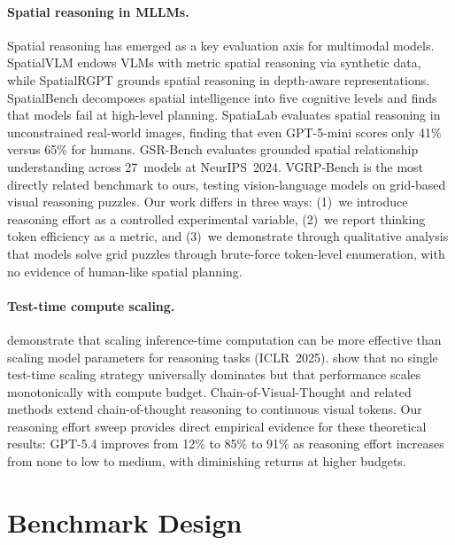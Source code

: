 \documentclass[11pt]{article}
\begin{document}
\paragraph{Spatial reasoning in MLLMs.}
Spatial reasoning has emerged as a key evaluation axis for multimodal models.
SpatialVLM \cite{chen2024spatialvlm} endows VLMs with metric spatial reasoning via synthetic data, while SpatialRGPT \cite{cheng2024spatialrgpt} grounds spatial reasoning in depth-aware representations.
SpatialBench \cite{xu2025spatialbench} decomposes spatial intelligence into five cognitive levels and finds that models fail at high-level planning.
SpatiaLab \cite{tong2026spatialab} evaluates spatial reasoning in unconstrained real-world images, finding that even GPT-5-mini scores only 41\% versus 65\% for humans.
GSR-Bench \cite{rajabi2024gsrbench} evaluates grounded spatial relationship understanding across 27~models at NeurIPS~2024.
VGRP-Bench \cite{ren2025vgrpbench} is the most directly related benchmark to ours, testing vision-language models on grid-based visual reasoning puzzles.
Our work differs in three ways: (1)~we introduce reasoning effort as a controlled experimental variable, (2)~we report thinking token efficiency as a metric, and (3)~we demonstrate through qualitative analysis that models solve grid puzzles through brute-force token-level enumeration, with no evidence of human-like spatial planning.

\paragraph{Test-time compute scaling.}
\citet{snell2025scaling} demonstrate that scaling inference-time computation can be more effective than scaling model parameters for reasoning tasks (ICLR~2025).
\citet{liu2025art} show that no single test-time scaling strategy universally dominates but that performance scales monotonically with compute budget.
Chain-of-Visual-Thought \cite{chen2025covt} and related methods \cite{chen2025mcot} extend chain-of-thought reasoning to continuous visual tokens.
Our reasoning effort sweep provides direct empirical evidence for these theoretical results: GPT-5.4 improves from 12\% to 85\% to 91\% as reasoning effort increases from none to low to medium, with diminishing returns at higher budgets.


\section{Benchmark Design}
\label{sec:benchmark}
\end{document}
